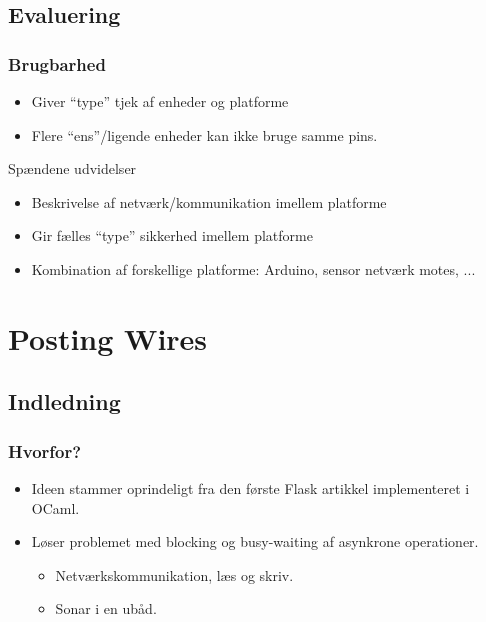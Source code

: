 \documentclass[t]{beamer}
\begin{document}
\subsection{Evaluering}

\begin{frame}
  \frametitle{Brugbarhed}
  
  \begin{itemize}
  \item Giver "`type"' tjek af enheder og platforme

  \item Flere "`ens"'/ligende enheder kan ikke bruge samme pins.
  \end{itemize}

  Spændene udvidelser
  
  \begin{itemize}
  \item Beskrivelse af netværk/kommunikation imellem platforme

  \item Gir fælles "`type"' sikkerhed imellem platforme 

  \item Kombination af forskellige platforme: Arduino, sensor netværk motes, ...
  \end{itemize}


\end{frame}

\section{Posting Wires}

\subsection{Indledning}

\begin{frame}
  \frametitle{Hvorfor?}

  \begin{itemize}
  \item Ideen stammer oprindeligt fra den første Flask artikkel implementeret i
    OCaml.

  \item Løser problemet med blocking og busy-waiting af asynkrone operationer.
    \begin{itemize}
    \item Netværkskommunikation, læs og skriv.

    \item Sonar i en ubåd.
    \end{itemize}
  \end{itemize}


\end{frame}
\end{document}
